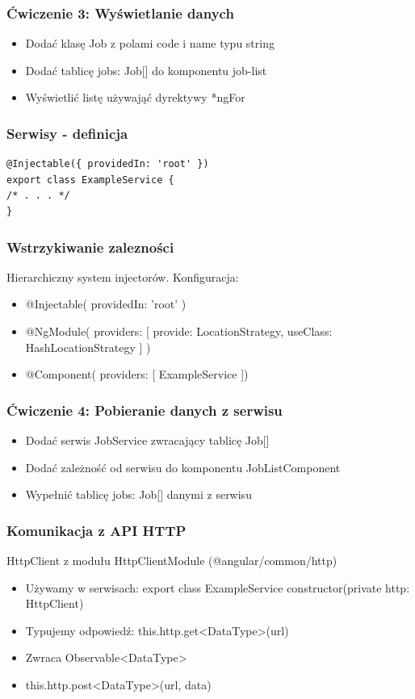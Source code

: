 \documentclass{beamer}
\begin{document}
\begin{frame}
    \frametitle{Ćwiczenie 3: Wyświetlanie danych}
    \begin{itemize}
        \item Dodać klasę Job z polami code i name typu string
        \item Dodać tablicę jobs: Job[] do komponentu job-list
        \item Wyświetlić listę używająć dyrektywy *ngFor
    \end{itemize}
\end{frame}

\begin{frame}[fragile]
    \frametitle{Serwisy - definicja}
\begin{lstlisting}
@Injectable({ providedIn: 'root' })
export class ExampleService {
/* . . . */
}
\end{lstlisting}
\end{frame}

\begin{frame}
    \frametitle{Wstrzykiwanie zalezności}
    Hierarchiczny system injectorów. Konfiguracja:
    \begin{itemize}
        \item @Injectable({ providedIn: 'root' })
        \item @NgModule({ providers: [{ provide: LocationStrategy, useClass: HashLocationStrategy }] })
        \item @Component({ providers: [ ExampleService ]})
    \end{itemize}
\end{frame}

\begin{frame}
    \frametitle{Ćwiczenie 4: Pobieranie danych z serwisu}
    \begin{itemize}
        \item Dodać serwis JobService zwracający tablicę Job[]
        \item Dodać zależność od serwisu do komponentu JobListComponent
        \item Wypełnić tablicę jobs: Job[] danymi z serwisu
    \end{itemize}
\end{frame}

\begin{frame}
    \frametitle{Komunikacja z API HTTP}
    HttpClient z modułu HttpClientModule (@angular/common/http)
    \begin{itemize}
        \item Używamy w serwisach:
export class ExampleService {
  constructor(private http: HttpClient) { }
}
        \item Typujemy odpowiedź: this.http.get<DataType>(url)
        \item Zwraca Observable<DataType>
        \item this.http.post<DataType>(url, data)
    \end{itemize}
\end{frame}
\end{document}
